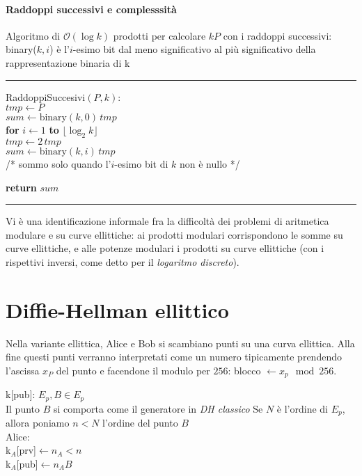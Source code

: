 \documentclass{article}
\begin{document}
\paragraph{Raddoppi successivi e complesssità} Algoritmo di $\mathcal{O}(\log k)$ prodotti per calcolare $kP$ con i raddoppi successivi:
 binary($k,i$) è l'$i$-esimo bit dal meno significativo al più significativo della rappresentazione binaria di k
\hrule
RaddoppiSuccesivi$(P,k)$:\\
\indent\indent $tmp \leftarrow P$\\
\indent\indent $sum \leftarrow \text{binary}(k,0)\, tmp$\\
\indent\indent \textbf{for} $i\leftarrow 1$ \textbf{to} $\lfloor \log_2 k\rfloor$\\
\indent\indent\indent\indent $tmp\leftarrow 2\,tmp$\\
\indent\indent\indent\indent $sum \leftarrow \text{binary}(k,i)\,tmp$\\
/*  sommo solo quando l'$i$-esimo bit di $k$ non è nullo */

\indent\indent \textbf{return} $sum$\\

\hrule

Vi è una identificazione informale fra la difficoltà dei problemi di aritmetica modulare e su curve ellittiche: ai prodotti modulari corrispondono le somme su curve ellittiche, e alle potenze modulari i prodotti su curve ellittiche (con i rispettivi inversi, come detto per il \textit{logaritmo discreto}).

\section{Diffie-Hellman ellittico}

Nella variante ellittica, Alice e Bob si scambiano punti su una curva ellittica. Alla fine questi punti verranno interpretati come un numero tipicamente prendendo l'ascissa $x_P$ del punto e facendone il modulo per $256$: blocco  $\leftarrow x_p\mod{256}$.

k[pub]: $E_p, B\in E_p$ \\
Il punto $B$ si comporta come il generatore in \textit{DH classico}
Se $N$ è l'ordine di $E_p$, allora poniamo $n<N$ l'ordine del punto $B$\\

Alice:\\
\indent\indent k$_A$[prv]$\leftarrow n_A<n$\\
\indent\indent k$_A$[pub]$\leftarrow n_A B$
\end{document}
